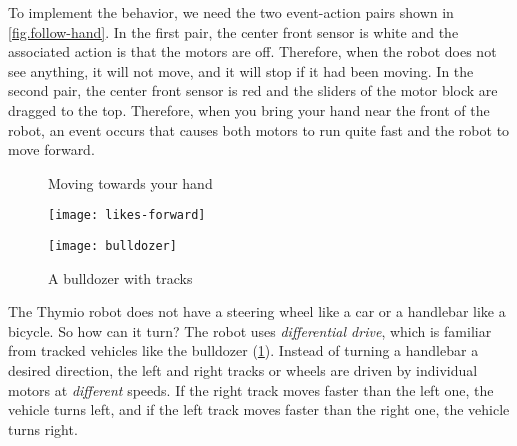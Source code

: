 
To implement the behavior, we need the two event-action pairs shown in
\cref{fig.follow-hand}. In the first pair, the center front sensor
is white and the associated action is that the motors are off.
Therefore, when the robot does not see anything, it will not move, and it
will stop if it had been moving. In the second pair, the center front
sensor is red and the sliders of the motor block are dragged to the top.
Therefore, when you bring your hand near the front of the robot, an event occurs that causes both motors to run quite fast and the robot to move forward.

\begin{figure}
\begin{floatrow}
	\ffigbox
	{\caption{Moving towards your hand}\label{fig.follow-hand}}
	{\texttt{[image: likes-forward]}}
	\ffigbox
	{\caption{A bulldozer with tracks}\label{fig.bull}}
	{\texttt{[image: bulldozer]}}
\end{floatrow}
\end{figure}



The Thymio robot does not have a steering wheel like a car or a
handlebar like a bicycle. So how can it turn? The robot uses
\emph{differential drive}, which is familiar from tracked vehicles like the
bulldozer (\cref{fig.bull}). Instead of turning a handlebar a
desired direction, the left and right tracks or wheels are driven by
individual motors at \emph{different} speeds. If the right track moves
faster than the left one, the vehicle turns left, and if the left track
moves faster than the right one, the vehicle turns right.

